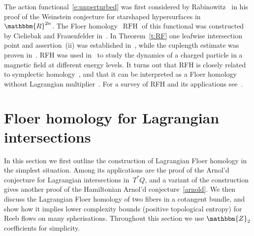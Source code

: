 \documentclass[12pt,twoside]{amsart}
\theoremstyle{plain}
\numberwithin{figure}{section}
\numberwithin{equation}{section}
\def\RFH{\operatorname{RFH}}
\def\RR{\mathbbm{R}}
\def\ZZ{\mathbbm{Z}}
\begin{document}
The action functional~\eqref{e:unperturbed} was first considered by Rabinowitz~\cite{Rab78} in his proof of the
Weinstein conjecture for starshaped hypersurfaces in~$\RR^{2n}$.
The Floer homology~$\RFH$ of this functional was constructed by Cieliebak and Frauenfelder in~\cite{CieFra09}.
%
In Theorem~\ref{t:RF} one leafwise intersection point and assertion~(ii) was established
in~\cite{AlbFra10}, while the cuplength estimate was proven in~\cite{almo10}.
%
RFH was used in~\cite{CieFraPat10} to study the dynamics of a charged particle 
in a magnetic field at different energy levels.
It turns out that RFH is closely related to symplectic homology~\cite{CieFraOan10}, 
and that it can be interpreted as a Floer homology without Lagrangian multiplier~\cite{AbMe15, CiOa15}. 
For a survey of RFH and its applications see~\cite{AlbFra12}.


\section{Floer homology for Lagrangian intersections} \label{s:Lag}

In this section we first outline the construction of Lagrangian Floer homology in the simplest situation. 
Among its applications are the proof of the Arnol'd conjecture for Lagrangian intersections in~$T^*Q$,
and a variant of the construction gives another proof of the Hamiltonian Arnol'd conjecture~\ref{arnold}.
We then discuss the Lagrangian Floer homology of two fibers in a cotangent bundle, and show how it implies
lower complexity bounds (positive topological entropy) for Reeb flows on many spherisations.
Throughout this section we use $\ZZ_2$ coefficients for simplicity.
\end{document}
